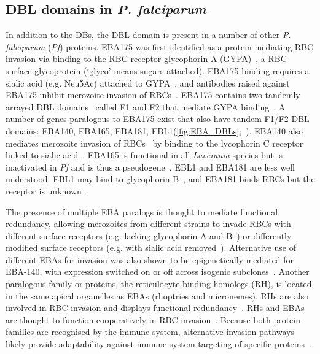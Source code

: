 \documentclass[12pt]{article}
\begin{document}
\subsection{DBL domains in \textit{P. falciparum}}

In addition to the DBs, the DBL domain is present in a number of other \textit{P.
falciparum} (\textit{Pf}) proteins. EBA175 was first identified as a protein mediating
RBC invasion via binding to the RBC receptor glycophorin A (GYPA)~\cite{Orlandi1992}, a
RBC surface glycoprotein (`glyco' means sugars attached). EBA175 binding requires a
sialic acid (e.g. Neu5Ac) attached to GYPA~\cite{Orlandi1992}, and antibodies raised
against EBA175 inhibit merozoite invasion of RBCs~\cite{Sim1990}. EBA175 contains two
tandemly arrayed DBL domains~\cite{Adams7085} called F1 and F2 that mediate GYPA
binding~\cite{Tolia2005}.  A number of genes paralogous to EBA175 exist that also have
tandem F1/F2 DBL domains: EBA140, EBA165, EBA181,
EBL1(\cref{fig:EBA_DBLs};~\cite{Adams2001}). EBA140 also mediates merozoite invasion of
RBCs~\cite{Mayer5222} by binding to the lycophorin C receptor linked to sialic
acid~\cite{Lobo2003}. EBA165 is functional in all \textit{Laverania} species but is
inactivated in \textit{Pf} and is thus a pseudogene~\cite{Proto2019}. EBL1 and EBA181 are
less well understood. EBL1 may bind to glycophorin B~\cite{Jaskiewicz2019}, and EBA181
binds RBCs but the receptor is unknown~\cite{Gilberger2003}.

The presence of multiple EBA paralogs is thought to mediate functional redundancy,
allowing merozoites from different strains to invade RBCs with different surface
receptors (e.g. lacking glycophorin A and B~\cite{Hadley1987}) or differently modified
surface receptors (e.g. with sialic acid removed~\cite{Mitchell1986,Stubbs2005}).
Alternative use of different EBAs for invasion was also shown to be epigenetically
mediated for EBA-140, with expression switched on or off across isogenic
subclones~\cite{Corts2007}. Another
paralogous family or proteins, the reticulocyte-binding homologs (RH), is located in the
same apical organelles as EBAs (rhoptries and micronemes). RHs are also involved in RBC invasion
and displays functional redundancy~\cite{Gunalan2012}. RHs and EBAs are thought to
function cooperatively in RBC invasion~\cite{Lopaticki2011}. Because both protein
families are recognised by the immune system, alternative invasion pathways likely
provide adaptability against immune system targeting of specific
proteins~\cite{Wright2014}.
\end{document}
